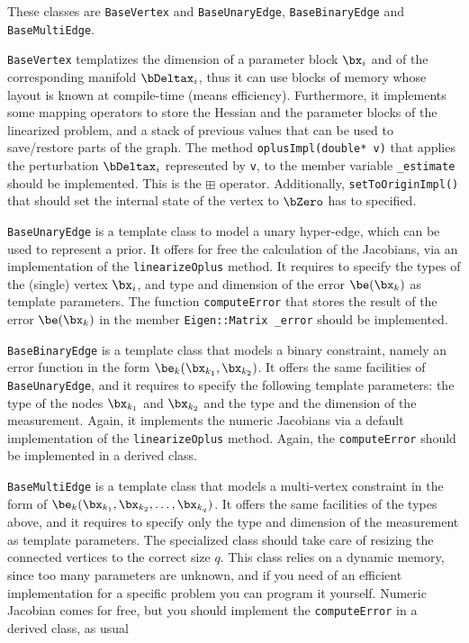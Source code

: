\documentclass[a4paper]{article}
\begin{document}
These classes are \verb+BaseVertex+ and \verb+BaseUnaryEdge+,
\verb+BaseBinaryEdge+ and \verb+BaseMultiEdge+.
\begin{description}
\item \verb+BaseVertex+ templatizes the dimension of a parameter block
  $\bx_i$ and of the corresponding manifold $\bDeltax_i$, thus it can
  use blocks of memory whose layout is known at compile-time (means
  efficiency). Furthermore, it implements some mapping operators to
  store the Hessian and the parameter blocks of the linearized
  problem, and a stack of previous values that can be used to
  save/restore parts of the graph.  The method \verb+oplusImpl(double* v)+
  that applies the perturbation $\bDeltax_i$ represented by \verb+v+,
  to the member variable \verb+_estimate+ should be implemented. This
  is the $\boxplus$ operator. Additionally,
  \verb+setToOriginImpl()+ that should set the internal state of the vertex
  to $\bZero$ has to specified.

\item \verb+BaseUnaryEdge+ is a template class to model a unary
  hyper-edge, which can be used to represent a prior. It offers for
  free the calculation of the Jacobians, via an implementation of the
  \verb+linearizeOplus+ method. It requires to specify the types of
  the (single) vertex $\bx_i$, and type and dimension of the error
  $\be(\bx_k)$ as template parameters.  The function
  \verb+computeError+ that stores the result of the error $\be(\bx_k)$ in the
  member \verb+Eigen::Matrix _error+ should be implemented.

\item \verb+BaseBinaryEdge+ is a template class that models a binary
  constraint, namely an error function in the form $\be_k(\bx_{k_1},
  \bx_{k_2})$. It offers the same facilities of \verb+BaseUnaryEdge+, and it
  requires to specify the following template parameters: the type of the nodes
  $\bx_{k_1}$ and $\bx_{k_2}$  and the  type and the dimension of the measurement.
  Again, it implements the numeric Jacobians via
  a default implementation of the \verb+linearizeOplus+ method.
  Again, the \verb+computeError+ should be implemented in a derived class.

\item \verb+BaseMultiEdge+ is a template class that models a
  multi-vertex constraint in the form of $\be_k(\bx_{k_1}, \bx_{k_2},
  \ldots, \bx_{k_q})$. It offers the same facilities of the types
  above, and it requires to specify only the type and dimension of the
  measurement as template parameters. The specialized class should
  take care of resizing the connected vertices to the correct size
  $q$.  This class relies on a dynamic memory, since too many
  parameters are unknown, and if you need of an efficient
  implementation for a specific problem you can program it yourself.
  Numeric Jacobian comes for free, but you should implement the
  \verb+computeError+ in a derived class, as usual
\end{description}
\end{document}
